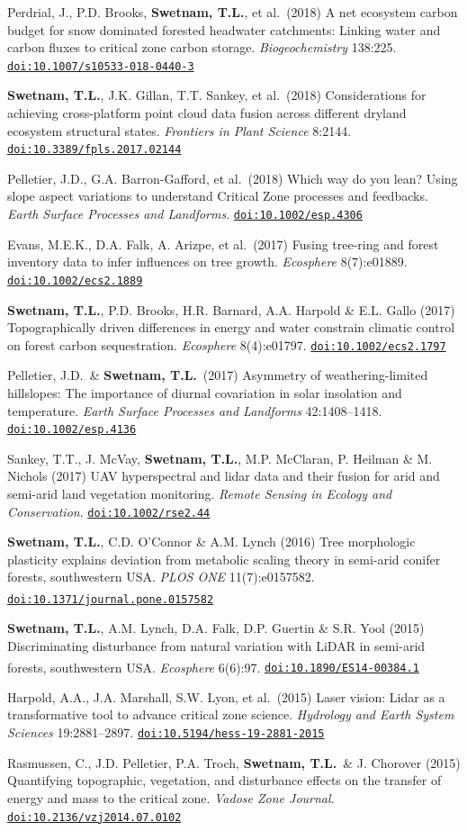 \documentclass[11pt,letterpaper]{article}
\newcommand{\me}{\textbf{Swetnam, T.L.}}
\newcommand{\doi}[1]{\href{https://doi.org/#1}{\nolinkurl{doi:#1}}}
\newcommand{\grad}{\textsuperscript{\color{muted}\,\dag}}
\newcounter{revno}
\newenvironment{revlist}[1]
  {\setcounter{revno}{#1}\stepcounter{revno}%
   \begin{list}{}{\setlength{\leftmargin}{2.1em}\setlength{\labelwidth}{1.7em}%
     \setlength{\labelsep}{0.4em}\setlength{\itemsep}{3.5pt}\setlength{\parsep}{0pt}\setlength{\topsep}{2pt}}}
  {\end{list}}
\newcommand{\pub}{\addtocounter{revno}{-1}\item[{\small\color{muted}\arabic{revno}.}]}
\begin{document}
\begin{revlist}{40}
\pub Perdrial, J., P.D. Brooks, \me, et al.\ (2018) A net ecosystem carbon budget for snow dominated forested headwater catchments: Linking water and carbon fluxes to critical zone carbon storage. \textit{Biogeochemistry} 138:225. \doi{10.1007/s10533-018-0440-3}
\pub \me, J.K. Gillan, T.T. Sankey, et al.\ (2018) Considerations for achieving cross-platform point cloud data fusion across different dryland ecosystem structural states. \textit{Frontiers in Plant Science} 8:2144. \doi{10.3389/fpls.2017.02144}
\pub Pelletier, J.D., G.A. Barron-Gafford, et al.\ (2018) Which way do you lean? Using slope aspect variations to understand Critical Zone processes and feedbacks. \textit{Earth Surface Processes and Landforms}. \doi{10.1002/esp.4306}
\pub Evans, M.E.K., D.A. Falk, A. Arizpe, et al.\ (2017) Fusing tree-ring and forest inventory data to infer influences on tree growth. \textit{Ecosphere} 8(7):e01889. \doi{10.1002/ecs2.1889}
\pub \me, P.D. Brooks, H.R. Barnard, A.A. Harpold \& E.L. Gallo (2017) Topographically driven differences in energy and water constrain climatic control on forest carbon sequestration. \textit{Ecosphere} 8(4):e01797. \doi{10.1002/ecs2.1797}
\pub Pelletier, J.D.\ \& \me\ (2017) Asymmetry of weathering-limited hillslopes: The importance of diurnal covariation in solar insolation and temperature. \textit{Earth Surface Processes and Landforms} 42:1408--1418. \doi{10.1002/esp.4136}
\pub Sankey, T.T., J. McVay, \me, M.P. McClaran, P. Heilman \& M. Nichols (2017) UAV hyperspectral and lidar data and their fusion for arid and semi-arid land vegetation monitoring. \textit{Remote Sensing in Ecology and Conservation}. \doi{10.1002/rse2.44}
\pub \me, C.D. O'Connor \& A.M. Lynch (2016) Tree morphologic plasticity explains deviation from metabolic scaling theory in semi-arid conifer forests, southwestern USA. \textit{PLOS ONE} 11(7):e0157582. \doi{10.1371/journal.pone.0157582}\grad
\pub \me, A.M. Lynch, D.A. Falk, D.P. Guertin \& S.R. Yool (2015) Discriminating disturbance from natural variation with LiDAR in semi-arid forests, southwestern USA. \textit{Ecosphere} 6(6):97. \doi{10.1890/ES14-00384.1}\grad
\pub Harpold, A.A., J.A. Marshall, S.W. Lyon, et al.\ (2015) Laser vision: Lidar as a transformative tool to advance critical zone science. \textit{Hydrology and Earth System Sciences} 19:2881--2897. \doi{10.5194/hess-19-2881-2015}
\pub Rasmussen, C., J.D. Pelletier, P.A. Troch, \me\ \& J. Chorover (2015) Quantifying topographic, vegetation, and disturbance effects on the transfer of energy and mass to the critical zone. \textit{Vadose Zone Journal}. \doi{10.2136/vzj2014.07.0102}

\end{revlist}
\end{document}
